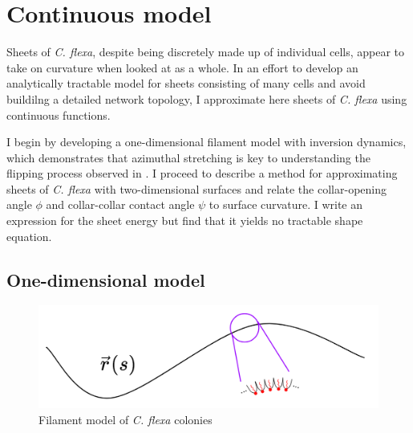 
\chapter{Continuous model} \label{ch:2}

\ifpdf
    \graphicspath{{Chapter2/Figs/Raster/}{Chapter2/Figs/PDF/}{Chapter2/Figs/}}
\else
    \graphicspath{{Chapter2/Figs/Vector/}{Chapter2/Figs/}}
\fi

Sheets of \textit{C. flexa}, despite being discretely made up of individual cells, appear to take on curvature when looked at as a whole. 
In an effort to develop an analytically tractable model for sheets consisting of many cells and avoid buildilng a detailed network topology, I approximate here sheets of \textit{C. flexa} using continuous functions.

I begin by developing a one-dimensional filament model with inversion dynamics, which demonstrates that azimuthal stretching is key to understanding the flipping process observed in \citet{brunet2019}. 
I proceed to describe a method for approximating sheets of \textit{C. flexa} with two-dimensional surfaces and relate the collar-opening angle $\phi$ and collar-collar contact angle $\psi$ to surface curvature. 
I write an expression for the sheet energy but find that it yields no tractable shape equation.

\section{One-dimensional model} \label{sec:c_1d}

\begin{figure}[htbp]
	\centering
	\includegraphics[width=\textwidth]{chain.png}
	\caption{Filament model of \textit{C. flexa} colonies}
	\label{fig:chain}
\end{figure}

